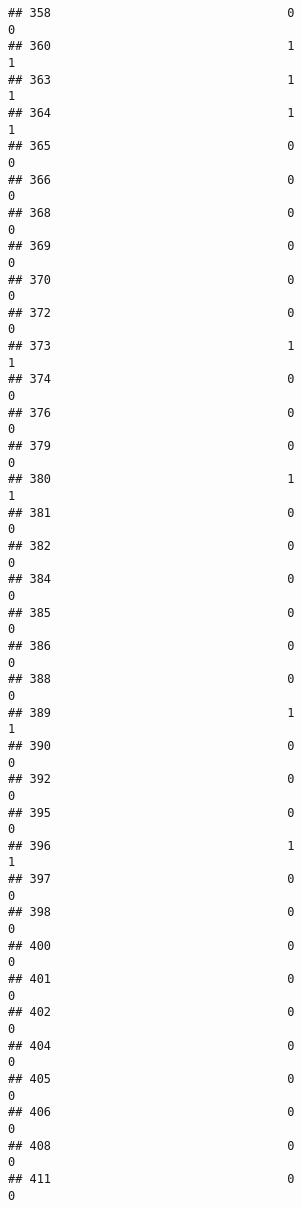 \documentclass[
]{article}
\begin{document}
\begin{verbatim}
## 358                                 0                                0
## 360                                 1                                1
## 363                                 1                                1
## 364                                 1                                1
## 365                                 0                                0
## 366                                 0                                0
## 368                                 0                                0
## 369                                 0                                0
## 370                                 0                                0
## 372                                 0                                0
## 373                                 1                                1
## 374                                 0                                0
## 376                                 0                                0
## 379                                 0                                0
## 380                                 1                                1
## 381                                 0                                0
## 382                                 0                                0
## 384                                 0                                0
## 385                                 0                                0
## 386                                 0                                0
## 388                                 0                                0
## 389                                 1                                1
## 390                                 0                                0
## 392                                 0                                0
## 395                                 0                                0
## 396                                 1                                1
## 397                                 0                                0
## 398                                 0                                0
## 400                                 0                                0
## 401                                 0                                0
## 402                                 0                                0
## 404                                 0                                0
## 405                                 0                                0
## 406                                 0                                0
## 408                                 0                                0
## 411                                 0                                0

\end{verbatim}
\end{document}
